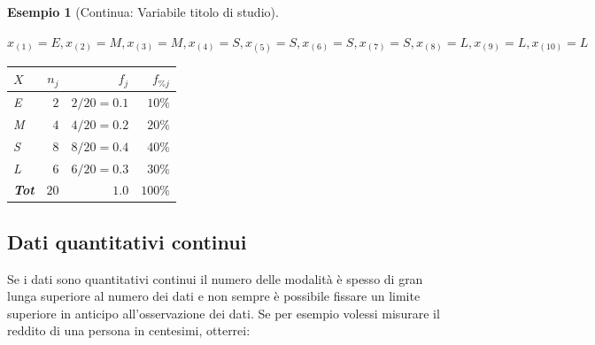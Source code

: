 \documentclass[
  11pt,
]{book}
\theoremstyle{mytheoremstyle}
\theoremstyle{mydefstyle}
\newtheorem{example}{{Esempio}}[section]
\begin{document}
\begin{example}[Continua: Variabile titolo di studio]

\(\phantom{.}\)

\(x_{(1)}=E,x_{(2)}=M,x_{(3)}=M,x_{(4)}=S,x_{(5)}=S,x_{(6)}=S,x_{(7)}=S,x_{(8)}=L,x_{(9)}=L,
x_{(10)}=L\)

\begin{table}[!h]
\centering
\begin{tabular}{lrrr}
\toprule
$X$ & $n_j$ & $f_j$ & $f_{\% j}$\\
\midrule
E & $2$ & $2/20=0.1$ & $10\%$\\
M & $4$ & $4/20=0.2$ & $20\%$\\
S & $8$ & $8/20=0.4$ & $40\%$\\
L & $6$ & $6/20=0.3$ & $30\%$\\
\midrule
\textbf{Tot} & \textbf{$20$} & \textbf{$1.0$} & \textbf{$100\%$}\\
\midrule
\bottomrule
\end{tabular}
\end{table}

\end{example}

\subsection{Dati quantitativi continui}\label{dati-quantitativi-continui}

Se i dati sono quantitativi continui il numero delle modalità è spesso di
gran lunga superiore al numero dei dati e non sempre è possibile fissare un limite superiore
in anticipo all'osservazione dei dati. Se per esempio volessi misurare il
reddito di una persona in centesimi, otterrei:
\end{document}
